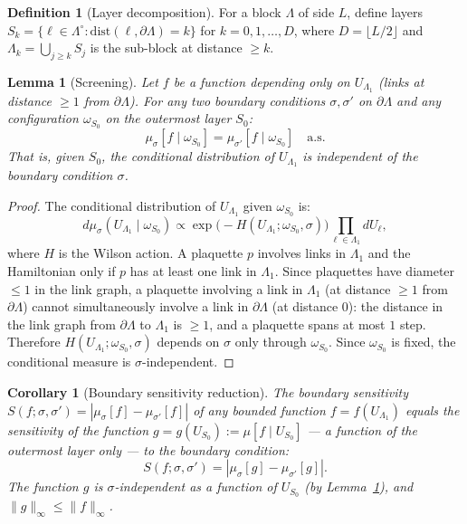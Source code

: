 \documentclass[11pt,a4paper]{article}
\theoremstyle{plain}
\newtheorem{lemma}[theorem]{Lemma}
\newtheorem{corollary}[theorem]{Corollary}
\theoremstyle{definition}
\newtheorem{definition}[theorem]{Definition}
\theoremstyle{remark}
\begin{document}
\begin{definition}[Layer decomposition]
For a block $\Lambda$ of side $L$, define layers
$S_k = \{\ell \in \Lambda^\circ : \mathrm{dist}(\ell,
\partial\Lambda) = k\}$ for $k = 0, 1, \ldots, D$, where
$D = \lfloor L/2 \rfloor$ and $\Lambda_k = \bigcup_{j \ge k} S_j$
is the sub-block at distance $\ge k$.
\end{definition}

\begin{lemma}[Screening]\label{lem:screening}
Let $f$ be a function depending only on $U_{\Lambda_1}$
(links at distance $\ge 1$ from $\partial\Lambda$).
For any two boundary conditions $\sigma, \sigma'$ on
$\partial\Lambda$ and any configuration $\omega_{S_0}$
on the outermost layer $S_0$:
\begin{equation}\label{eq:screening}
  \mu_{\sigma}[f \mid \omega_{S_0}]
  = \mu_{\sigma'}[f \mid \omega_{S_0}] \quad \text{a.s.}
\end{equation}
That is, given $S_0$, the conditional distribution of
$U_{\Lambda_1}$ is independent of the boundary condition
$\sigma$.
\end{lemma}

\begin{proof}
The conditional distribution of $U_{\Lambda_1}$ given
$\omega_{S_0}$ is:
\[
  d\mu_{\sigma}(U_{\Lambda_1} \mid \omega_{S_0})
  \propto \exp\!\bigl(-H(U_{\Lambda_1};\omega_{S_0}, \sigma)\bigr)
  \prod_{\ell \in \Lambda_1} dU_\ell,
\]
where $H$ is the Wilson action.  A plaquette $p$ involves
links in $\Lambda_1$ and the Hamiltonian only if $p$ has
at least one link in $\Lambda_1$.  Since plaquettes have
diameter $\le 1$ in the link graph, a plaquette involving
a link in $\Lambda_1$ (at distance $\ge 1$ from $\partial\Lambda$)
cannot simultaneously involve a link in $\partial\Lambda$
(at distance $0$): the distance in the link graph from
$\partial\Lambda$ to $\Lambda_1$ is $\ge 1$, and a plaquette
spans at most $1$ step.  Therefore $H(U_{\Lambda_1};
\omega_{S_0}, \sigma)$ depends on $\sigma$ only through
$\omega_{S_0}$.  Since $\omega_{S_0}$ is fixed, the
conditional measure is $\sigma$-independent.
\end{proof}

\begin{corollary}[Boundary sensitivity reduction]
\label{cor:sens_red}
The boundary sensitivity $S(f;\sigma,\sigma') =
|\mu_\sigma[f] - \mu_{\sigma'}[f]|$ of any bounded function
$f = f(U_{\Lambda_1})$ equals the sensitivity of the
function $g = g(U_{S_0}) := \mu[f \mid U_{S_0}]$ --- a
function of the outermost layer only --- to the boundary condition:
\begin{equation}\label{eq:sens_red}
  S(f; \sigma, \sigma')
  = |\mu_\sigma[g] - \mu_{\sigma'}[g]|.
\end{equation}
The function $g$ is $\sigma$-independent as a function of
$U_{S_0}$ (by Lemma~\ref{lem:screening}), and
$\|g\|_\infty \le \|f\|_\infty$.
\end{corollary}
\end{document}
